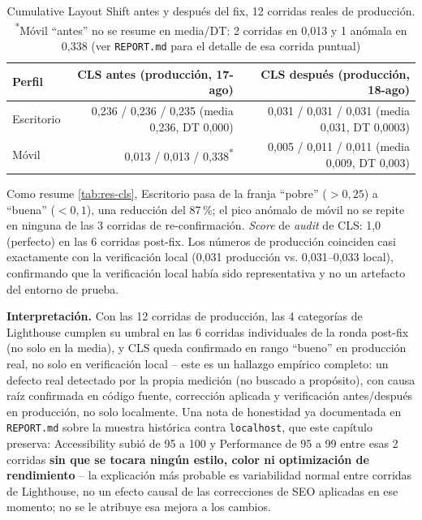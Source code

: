 \begin{table}[h]
\centering
\scriptsize
\setlength{\tabcolsep}{2pt}
\begin{tabular}{lrr}
\toprule
Perfil & CLS antes (producción, 17-ago) & CLS después (producción, 18-ago) \\
\midrule
Escritorio & 0,236 / 0,236 / 0,235 (media 0,236, DT 0,000) & 0,031 / 0,031 / 0,031 (media 0,031, DT 0,0003) \\
Móvil & 0,013 / 0,013 / 0,338\textsuperscript{*} & 0,005 / 0,011 / 0,011 (media 0,009, DT 0,003) \\
\bottomrule
\end{tabular}
\caption{Cumulative Layout Shift antes y después del fix, 12 corridas
  reales de producción. \textsuperscript{*}Móvil ``antes'' no se
  resume en media/DT: 2 corridas en 0,013 y 1 anómala en 0,338 (ver
  \texttt{REPORT.md} para el detalle de esa corrida puntual)}
\label{tab:res-cls}
\end{table}

Como resume \autoref{tab:res-cls}, Escritorio pasa de la franja ``pobre'' ($>0,25$) a ``buena'' ($<0,1$),
una reducción del 87\,\%; el pico anómalo de móvil no se repite en
ninguna de las 3 corridas de re-confirmación. \emph{Score} de
\emph{audit} de CLS: 1,0 (perfecto) en las 6 corridas post-fix. Los
números de producción coinciden casi exactamente con la verificación
local (0,031 producción vs. 0,031--0,033 local), confirmando que la
verificación local había sido representativa y no un artefacto del
entorno de prueba.

\textbf{Interpretación.} Con las 12 corridas de producción, las 4
categorías de Lighthouse cumplen su umbral en las 6 corridas
individuales de la ronda post-fix (no solo en la media), y CLS queda
confirmado en rango ``bueno'' en producción real, no solo en
verificación local -- este es un hallazgo empírico completo: un defecto
real detectado por la propia medición (no buscado a propósito), con
causa raíz confirmada en código fuente, corrección aplicada y
verificación antes/después en producción, no solo localmente. Una nota
de honestidad ya documentada en \texttt{REPORT.md} sobre la muestra
histórica contra \texttt{localhost}, que este capítulo preserva:
Accessibility subió de 95 a 100 y Performance de 95 a 99 entre esas 2
corridas \textbf{sin que se tocara ningún estilo, color ni optimización
de rendimiento} -- la explicación más probable es variabilidad normal
entre corridas de Lighthouse, no un efecto causal de las correcciones
de SEO aplicadas en ese momento; no se le atribuye esa mejora a los
cambios.

